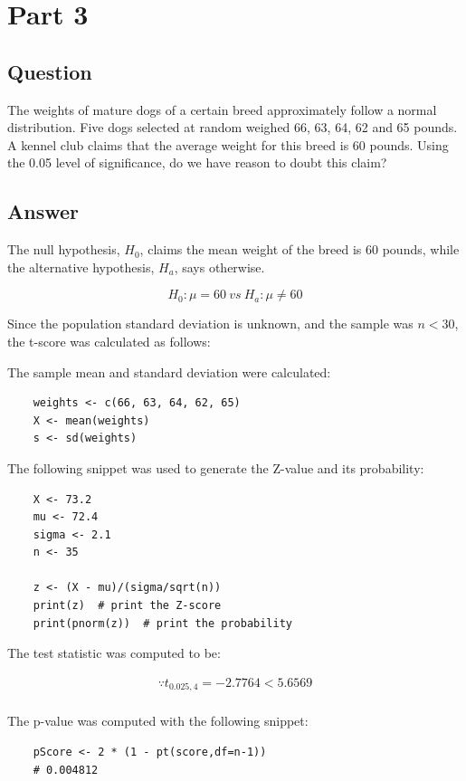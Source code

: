 \section{Part 3}
    \subsection{Question}
    The weights of mature dogs of a certain breed approximately follow a normal distribution. Five dogs selected at random weighed 66, 63, 64, 62 and 65 pounds. A kennel club claims that the average weight for this breed is 60 pounds. Using the 0.05 level of significance, do we have reason to doubt this claim?

    \subsection{Answer}
    The null hypothesis, $H_{0}$, claims the mean weight of the breed is 60 pounds, while the alternative hypothesis, $H_{a}$, says otherwise.

        \[ H_{0}: \mu = 60 \ vs \ H_{a}: \mu \neq 60 \]

    Since the population standard deviation is unknown, and the sample was $n < 30$, the t-score was calculated as follows:

    The sample mean and standard deviation were calculated:
\begin{lstlisting}
    weights <- c(66, 63, 64, 62, 65)
    X <- mean(weights)
    s <- sd(weights)
\end{lstlisting}

        


    The following snippet was used to generate the Z-value and its probability:
\begin{lstlisting}
    X <- 73.2
    mu <- 72.4
    sigma <- 2.1
    n <- 35

    z <- (X - mu)/(sigma/sqrt(n))
    print(z)  # print the Z-score
    print(pnorm(z))  # print the probability
\end{lstlisting}

    The test statistic was computed to be:

        \begin{align*}
            \because t_{0.025,4}=-2.7764 < 5.6569\\
        \end{align*}

    The p-value was computed with the following snippet:
\begin{lstlisting}
    pScore <- 2 * (1 - pt(score,df=n-1))
    # 0.004812
\end{lstlisting}

